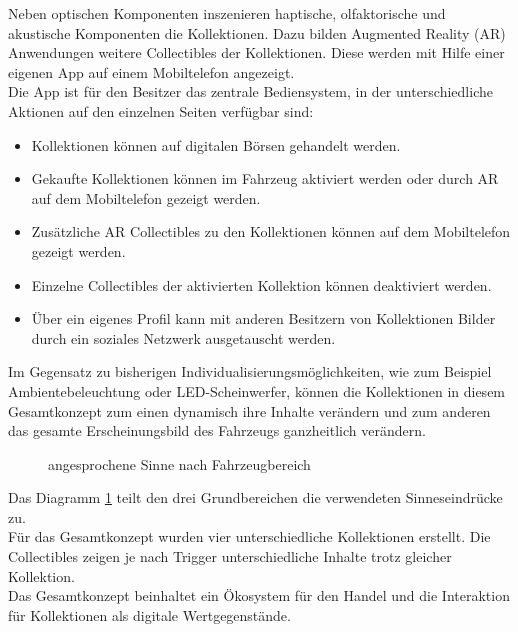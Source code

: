 Neben optischen Komponenten inszenieren haptische, olfaktorische und akustische Komponenten die Kollektionen. Dazu bilden Augmented Reality (AR) Anwendungen weitere Collectibles der Kollektionen. Diese werden mit Hilfe einer eigenen App auf einem Mobiltelefon angezeigt.\\
Die App ist für den Besitzer das zentrale Bediensystem, in der unterschiedliche Aktionen auf den einzelnen Seiten verfügbar sind:
\begin{itemize}
	\item Kollektionen können auf digitalen Börsen gehandelt werden.
	\item Gekaufte Kollektionen können im Fahrzeug aktiviert werden oder durch AR auf dem Mobiltelefon gezeigt werden.
	\item Zusätzliche AR Collectibles zu den Kollektionen können auf dem Mobiltelefon gezeigt werden.
	\item Einzelne Collectibles der aktivierten Kollektion können deaktiviert werden.
	\item Über ein eigenes Profil kann mit anderen Besitzern von Kollektionen Bilder durch ein soziales Netzwerk ausgetauscht werden.
\end{itemize}
Im Gegensatz zu bisherigen Individualisierungsmöglichkeiten, wie zum Beispiel Ambientebeleuchtung oder LED-Scheinwerfer, können die Kollektionen in diesem Gesamtkonzept zum einen dynamisch ihre Inhalte verändern und zum anderen das gesamte Erscheinungsbild des Fahrzeugs ganzheitlich verändern. \\
\begin{figure}[hbt]
	\centering
	
	\caption[angesprochene Sinne nach Fahrzeugbereich]{angesprochene Sinne nach Fahrzeugbereich}
	\label{fig:sinneeinteilung}
\end{figure}

Das Diagramm \ref{fig:sinneeinteilung} teilt den drei Grundbereichen die verwendeten Sinneseindrücke zu. \\
Für das Gesamtkonzept wurden vier unterschiedliche Kollektionen erstellt. Die Collectibles zeigen je nach Trigger unterschiedliche Inhalte trotz gleicher Kollektion. \\
Das Gesamtkonzept beinhaltet ein Ökosystem für den Handel und die Interaktion für Kollektionen als digitale Wertgegenstände.
